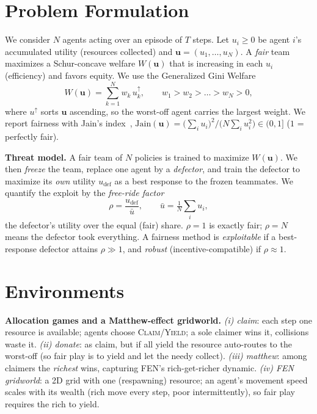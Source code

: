 \documentclass[conference, a4paper]{IEEEtran}
\begin{document}
\section{Problem Formulation}
We consider $N$ agents acting over an episode of $T$ steps. Let $u_i \ge 0$ be
agent $i$'s accumulated utility (resources collected) and
$\mathbf{u}=(u_1,\dots,u_N)$. A \emph{fair} team maximizes a Schur-concave welfare
$W(\mathbf{u})$ that is increasing in each $u_i$ (efficiency) and favors equity. We
use the Generalized Gini Welfare
\begin{equation}
W(\mathbf{u}) = \sum_{k=1}^{N} w_k\, u^{\uparrow}_k, \qquad
w_1 > w_2 > \dots > w_N > 0,
\end{equation}
where $u^{\uparrow}$ sorts $\mathbf{u}$ ascending, so the worst-off agent carries
the largest weight. We report fairness with Jain's
index~\cite{jain1984fairness},
$\mathrm{Jain}(\mathbf{u})=\big(\sum_i u_i\big)^2 / \big(N\sum_i u_i^2\big)\in(0,1]$
($1$ = perfectly fair).

\textbf{Threat model.} A fair team of $N$ policies is trained to maximize
$W(\mathbf{u})$. We then \emph{freeze} the team, replace one agent by a
\emph{defector}, and train the defector to maximize its \emph{own} utility
$u_{\mathrm{def}}$ as a best response to the frozen teammates. We quantify the
exploit by the \emph{free-ride factor}
\begin{equation}
\rho = \frac{u_{\mathrm{def}}}{\bar{u}}, \qquad
\bar{u} = \tfrac{1}{N}\textstyle\sum_i u_i,
\end{equation}
the defector's utility over the equal (fair) share. $\rho = 1$ is exactly fair;
$\rho = N$ means the defector took everything. A fairness method is
\emph{exploitable} if a best-response defector attains $\rho \gg 1$, and
\emph{robust} (incentive-compatible) if $\rho \approx 1$.

\section{Environments}
\textbf{Allocation games and a Matthew-effect gridworld.}
\emph{(i) claim}: each step one resource is available; agents choose
\textsc{Claim}/\textsc{Yield}; a sole claimer wins it, collisions waste it.
\emph{(ii) donate}: as claim, but if all yield the resource auto-routes to the
worst-off (so fair play is to yield and let the needy collect).
\emph{(iii) matthew}: among claimers the \emph{richest} wins, capturing FEN's
rich-get-richer dynamic.
\emph{(iv) FEN gridworld}: a 2D grid with one (respawning) resource; an agent's
movement speed scales with its wealth (rich move every step, poor
intermittently), so fair play requires the rich to yield.
\end{document}
